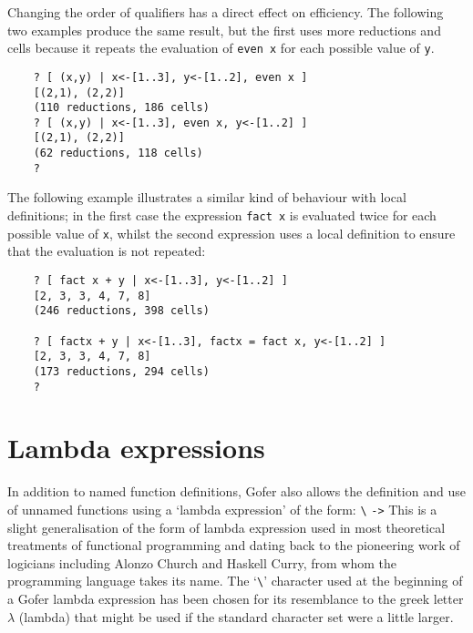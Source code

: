 \IT  Changing  the  order  of  qualifiers  has  a  direct   effect   on
     efficiency.  The following two examples produce the  same  result,
     but the first uses more reductions and cells  because  it  repeats
     the evaluation of \verb"even x" for each possible value of \verb"y".
\begin{verbatim}
    ? [ (x,y) | x<-[1..3], y<-[1..2], even x ]
    [(2,1), (2,2)]
    (110 reductions, 186 cells)
    ? [ (x,y) | x<-[1..3], even x, y<-[1..2] ]
    [(2,1), (2,2)]
    (62 reductions, 118 cells)
    ? 
\end{verbatim}
     The following example illustrates a similar kind of behaviour with
     local definitions; in the first case the expression  \verb"fact x"  is
     evaluated twice for each possible value of \verb"x", whilst the  second
     expression uses a local definition to ensure that  the  evaluation
     is not repeated:
\begin{verbatim}
    ? [ fact x + y | x<-[1..3], y<-[1..2] ]
    [2, 3, 3, 4, 7, 8]
    (246 reductions, 398 cells)

    ? [ factx + y | x<-[1..3], factx = fact x, y<-[1..2] ]
    [2, 3, 3, 4, 7, 8]
    (173 reductions, 294 cells)
    ?
\end{verbatim}
\EI

\section{Lambda expressions}
In addition to  named  function  definitions,  Gofer  also  allows  the
definition and use of unnamed functions using a `lambda expression'  of
the form:
\BQ
    \verb"\"  \verb"->" 
\EQ
This  is  a  slight  generalisation  of  the  form  of  lambda
expression  used  in  most   theoretical   treatments   of   functional
programming and  dating  back  to  the  pioneering  work  of  logicians
including Alonzo Church and Haskell Curry, from whom the programming language
takes its name.  The `\verb"\"' character used at the  beginning  of  a  Gofer
lambda expression has been chosen for  its  resemblance  to  the  greek
letter $\lambda$ (lambda)
that might be used if the standard character set  were  a
little larger.

